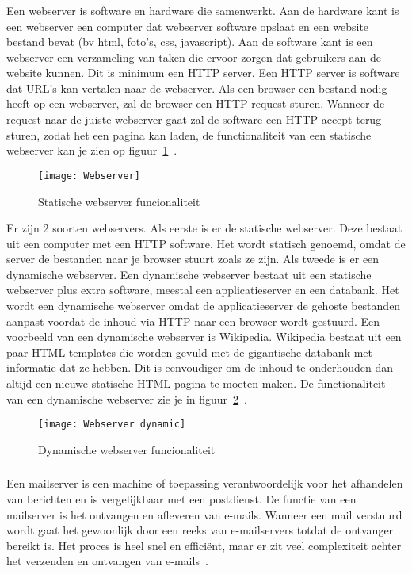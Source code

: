\subsubsection{}
\label{subsubsec:Webserver}
Een webserver is software en hardware die samenwerkt. Aan de hardware kant is een webserver een computer dat webserver software opslaat en een website bestand bevat (bv html, foto's, css, javascript). Aan de software kant is een webserver een verzameling van taken die ervoor zorgen dat gebruikers aan de website kunnen. Dit is minimum een HTTP server. Een HTTP server is software dat URL's kan vertalen naar de webserver. Als een browser een bestand nodig heeft op een webserver, zal de browser een HTTP request sturen. Wanneer de request naar de juiste webserver gaat zal de software een HTTP accept terug sturen, zodat het een pagina kan laden, de functionaliteit van een statische webserver kan je zien op figuur~\ref{fig:2.2}~\autocite{MDN2021}. 
\begin{figure}
    \texttt{[image: Webserver]}
    \caption{Statische webserver funcionaliteit\autocite{MDN2021} \label{fig:2.2}} 
\end{figure}

Er zijn 2 soorten webservers. Als eerste is er de statische webserver. Deze bestaat uit een computer met een HTTP software. Het wordt statisch genoemd, omdat de server de bestanden naar je browser stuurt zoals ze zijn. Als tweede is er een dynamische webserver. Een dynamische webserver bestaat uit een statische webserver plus extra software, meestal een applicatieserver en een databank. Het wordt een dynamische webserver omdat de applicatieserver de gehoste bestanden aanpast voordat de inhoud via HTTP naar een browser wordt gestuurd. Een voorbeeld van een dynamische webserver is Wikipedia. Wikipedia bestaat uit een paar HTML-templates die worden gevuld met de gigantische databank met informatie dat ze hebben. Dit is eenvoudiger om de inhoud te onderhouden dan altijd een nieuwe statische HTML pagina te moeten maken. De functionaliteit van een dynamische webserver zie je in figuur~\ref{fig:2.3}~\autocite{MDN2021}.
\begin{figure}
    \texttt{[image: Webserver dynamic]}
    \caption{Dynamische webserver funcionaliteit\autocite{GeeksforGeeks2020} \label{fig:2.3}}
\end{figure}
\subsubsection{}
\label{subsubsec:Mailserver}
Een mailserver is een machine of toepassing verantwoordelijk voor het afhandelen van berichten en is vergelijkbaar met een postdienst. De functie van een mailserver is het ontvangen en afleveren van e-mails. Wanneer een mail verstuurd wordt gaat het gewoonlijk door een reeks van e-mailservers totdat de ontvanger bereikt is. Het proces is heel snel en efficiënt, maar er zit veel complexiteit achter het verzenden en ontvangen van e-mails~\autocite{Gatefy2021}.

